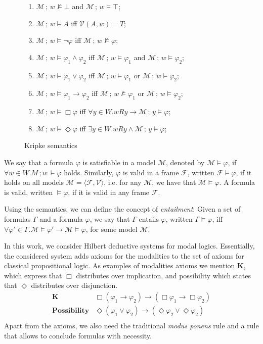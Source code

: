 \documentclass[sigconf]{acmart}
\begin{document}
\begin{figure}[H]
\begin{enumerate}
  \item $\mathcal{M}\,;\,w\not\models \bot$ and $\mathcal{M}\,;\,w\models \top$;
  \item $\mathcal{M}\,;\,w\models A$ iff $\mathcal{V}(A,w) = T$;
  \item $\mathcal{M}\,;\,w\models \neg\varphi$ iff $\mathcal{M}\,;\,w\not\models\varphi$;
  \item $\mathcal{M}\,;\,w\models \varphi_1 \land \varphi_2$ iff
    $\mathcal{M}\,;\,w\models\varphi_1$ and $\mathcal{M}\,;\,w\models\varphi_2$;
  \item $\mathcal{M}\,;\,w\models \varphi_1 \lor \varphi_2$ iff
    $\mathcal{M}\,;\,w\models\varphi_1$ or $\mathcal{M}\,;\,w\models\varphi_2$;
  \item $\mathcal{M}\,;\,w\models \varphi_1 \to \varphi_2$ iff
    $\mathcal{M}\,;\,w\not\models\varphi_1$ or $\mathcal{M}\,;\,w\models\varphi_2$;
  \item $\mathcal{M}\,;\,w\models\Box\varphi$ iff $\forall y \in W. w R y \to \mathcal{M}\,;\,y \models\varphi$;
  \item $\mathcal{M}\,;\,w\models\Diamond\varphi$ iff $\exists y \in W. w R y \land \mathcal{M}\,;\,y \models\varphi$;
  \end{enumerate}
  \caption{Kripke semantics}
  \label{fig:kripke}
\end{figure}
We say that a formula $\varphi$ is satisfiable in a model $\mathcal{M}$,
denoted by $\mathcal{M}\models \varphi$, if $\forall w \in W. M\,;w\,\models \varphi$ holds.
Similarly, $\varphi$ is valid in a frame $\mathcal{F}$, written $\mathcal{F}\models\varphi$, if
it holds on all models $\mathcal{M} = \langle \mathcal{F},\mathcal{V}\rangle$, i.e.
for any $\mathcal{M}$, we have that $\mathcal{M}\models\varphi$. A formula
is valid, written $\models \varphi$, if it is valid in any frame $\mathcal{F}$.

Using the semantics, we can define the concept of \emph{entailment}: Given a set
of formulas $\Gamma$ and a formula $\varphi$, we say that $\Gamma$ entails
$\varphi$, written $\Gamma\models\varphi$, iff $\forall \varphi' \in\Gamma .
\mathcal{M} \models \varphi' \to \mathcal{M} \models \varphi$, for some model $\mathcal{M}$.

In this work, we consider Hilbert deductive systems for modal logics.
Essentially, the considered system adds axioms for the modalities
to the set of axioms for classical propositional logic.
As examples of modalities axioms we mention \textbf{K}, which express that $\Box$ distributes
over implication, and possibility which states that $\Diamond$ distributes
over disjunction.
\[
  \begin{array}{ll}
    \textbf{K} & \Box(\varphi_1 \to \varphi_2) \to (\Box \varphi_1 \to \Box \varphi_2)\\
    \textbf{Possibility} & \Diamond (\varphi_1 \lor \varphi_2) \to
                           (\Diamond \varphi_2 \lor \Diamond \varphi_2)\\
  \end{array}
\]
Apart from the axioms, we also need the traditional \emph{modus ponens} rule
and a rule that allows to conclude formulas with necessity. 
\end{document}
